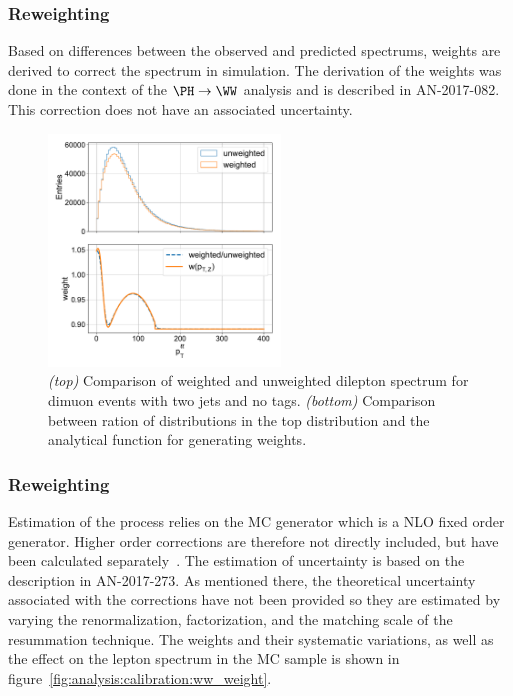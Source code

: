 \subsubsection{\PZ \pt  Reweighting}
Based on differences between the observed and predicted \PZ \pt spectrums, weights are derived to correct the \pt spectrum in simulation. The derivation of the weights was done in the context of the $\PH \rightarrow \WW $ analysis and is described in AN-2017-082. This correction does not have an associated uncertainty.
\begin{figure}[ht]
    \centering
    \includegraphics[width=0.55\textwidth]{chapters/Analysis/sectionCalibration/figures/generator/z_pt_weighting}
    \caption{\emph{(top)} Comparison of weighted and unweighted dilepton \pt spectrum for dimuon events with two jets and no \PQb tags. \emph{(bottom)} Comparison between ration of distributions in the top distribution and the analytical function for generating weights.}
    \label{fig:analysis:calibration:z_weight}
\end{figure}


\subsubsection{\WW \pt  Reweighting}
Estimation of the \WW process relies on the \POWHEG MC generator which is a NLO fixed order generator. Higher order corrections are therefore not directly included, but have been calculated separately~\cite{Meade:2014fca, Jaiswal:2014yba, Grazzini:2015wpa}.  The estimation of uncertainty is based on the description in AN-2017-273. As mentioned there, the theoretical uncertainty associated with the corrections have not been provided so they are estimated by varying the renormalization, factorization, and the matching scale of the \pt resummation technique. The weights and their systematic variations, as well as the effect on the lepton \pt spectrum in the \WW MC sample is shown in figure~\ref{fig:analysis:calibration:ww_weight}.

